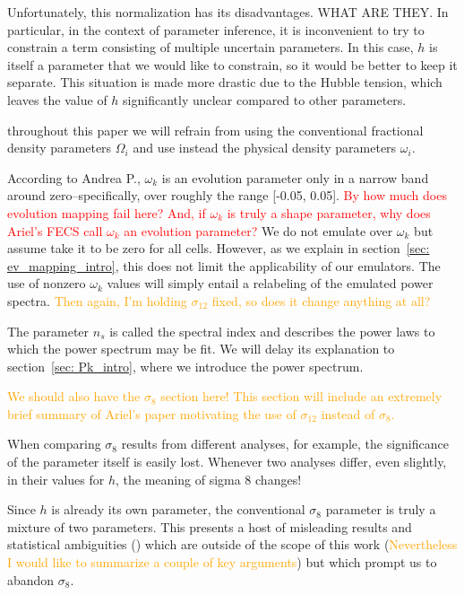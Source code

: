 Unfortunately, this normalization has its disadvantages. WHAT ARE THEY. In particular, in the context of parameter inference, it is inconvenient to try to constrain a term consisting of multiple uncertain parameters. In this case, $h$ is itself a parameter that we would like to constrain, so it would be better to keep it separate. This situation is made more drastic due to the Hubble tension, which leaves the value of $h$ significantly unclear compared to other parameters.

throughout this paper we will refrain from using the conventional
fractional density parameters $\Omega_i$ and use instead the physical density
parameters $\omega_i$.


According to Andrea P., $\omega_k$ is an evolution parameter only in a narrow 
band around zero--specifically, over roughly the range [-0.05, 0.05].
\textcolor{red}{By how much does evolution mapping fail here? And, if 
$\omega_k$ is truly a shape parameter, why does Ariel's FECS call $\omega_k$
an evolution parameter?} We do not emulate over $\omega_k$ but assume take
it to be zero for all cells. However, as we explain in
section~\ref{sec: ev_mapping_intro}, this does not limit the applicability of
our emulators. The use of nonzero $\omega_k$ values will simply entail a
relabeling of the emulated power spectra. \textcolor{orange}{Then again, I'm
holding $\sigma_{12}$ fixed, so does it change anything at all?}


The parameter $n_s$ is called the spectral index and describes the power laws
to which the power spectrum may be fit. We will delay its explanation to
section~\ref{sec: Pk_intro}, where we introduce the power spectrum.


\textcolor{orange}{We should also have the $\sigma_8$ section here! This 
section will include an extremely brief summary of Ariel's paper motivating 
the use of $\sigma_{12}$ instead of $\sigma_8$.}

When comparing $\sigma_8$ results from different analyses, for example, the significance of the parameter itself is easily lost. Whenever two analyses differ, even slightly, in their values for $h$, the meaning of sigma 8 changes!

Since $h$ is already its own parameter, the conventional $\sigma_8$ parameter 
is truly a mixture of two parameters. This presents a host of misleading 
results and statistical ambiguities () which are outside of the 
scope of this work (\textcolor{orange}{Nevertheless I would like to summarize 
a couple of key arguments}) but which prompt us to abandon $\sigma_8$.


